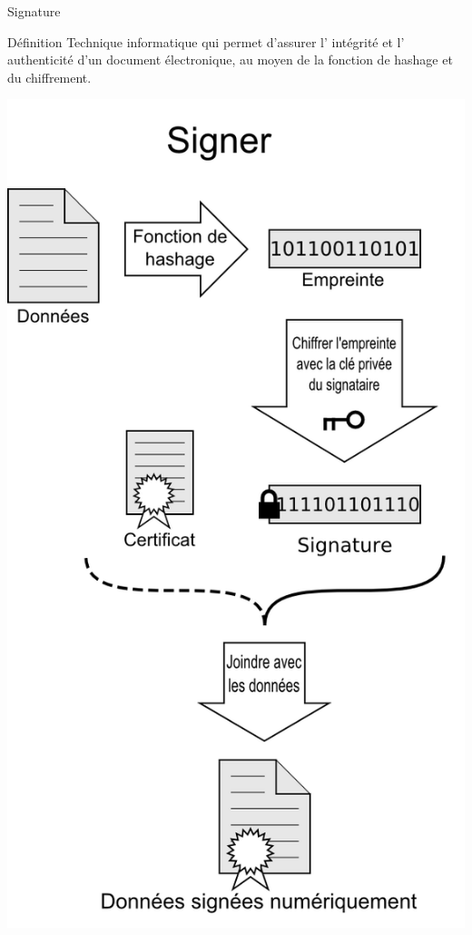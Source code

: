 \documentclass[12pt]{beamer}
\begin{document}
		\begin{frame}{Signature}
			\begin{exampleblock}{Définition}
				Technique informatique qui permet d'assurer l' \alert{intégrité} et l' \alert{authenticité} d'un document électronique, au moyen de la fonction de hashage et du chiffrement.
			\end{exampleblock}
		\end{frame}
		
		\begin{frame}{}
			\begin{center}
				\includegraphics[scale=.3]{Digital_Signature_diagram_01.png}
			\end{center}
		\end{frame}
		
\end{document}
